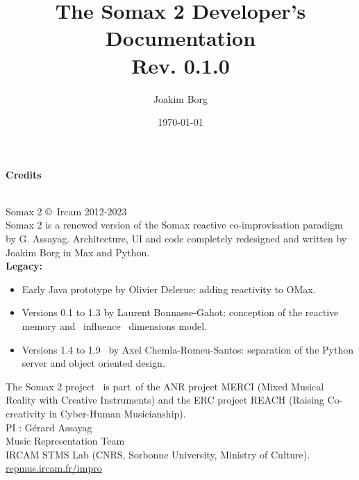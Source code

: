 \documentclass[10pt]{report}
\title{The Somax 2 Developer's Documentation\\[0.24cm]
	\large{Rev. 0.1.0}}
\author{Joakim Borg }
\date{\today}
\begin{document}
\maketitle
\chapter*{}
\large{\textbf{Credits}\\}\\
\small{
Somax 2 \copyright \ Ircam 2012-2023\\

\noindent Somax 2 is a renewed version of the Somax reactive co-improvisation paradigm by G. Assayag.
Architecture, UI and code completely redesigned and written by Joakim Borg in Max and Python.
\\

\noindent \textbf{Legacy:}
\begin{itemize}
\item Early Java prototype by Olivier Delerue: adding reactivity to OMax.
\item Versions 0.1 to 1.3 by Laurent Bonnasse-Gahot: conception of the reactive memory and  influence  dimensions model.
\item Versions 1.4 to 1.9  by Axel Chemla-Romeu-Santos: separation of the Python server and object oriented design.
\end{itemize}

\medskip
\noindent The Somax 2 project  is part of the ANR project MERCI (Mixed Musical Reality with Creative Instruments) and the ERC project REACH (Raising Co-creativity in Cyber-Human Musicianship).
\\

\noindent PI : Gérard Assayag\\
Music Representation Team\\
IRCAM STMS Lab (CNRS, Sorbonne University, Ministry of Culture).
\\

\noindent\url{repmus.ircam.fr/impro}
}


\tableofcontents







\appendix





{}

\end{document}
